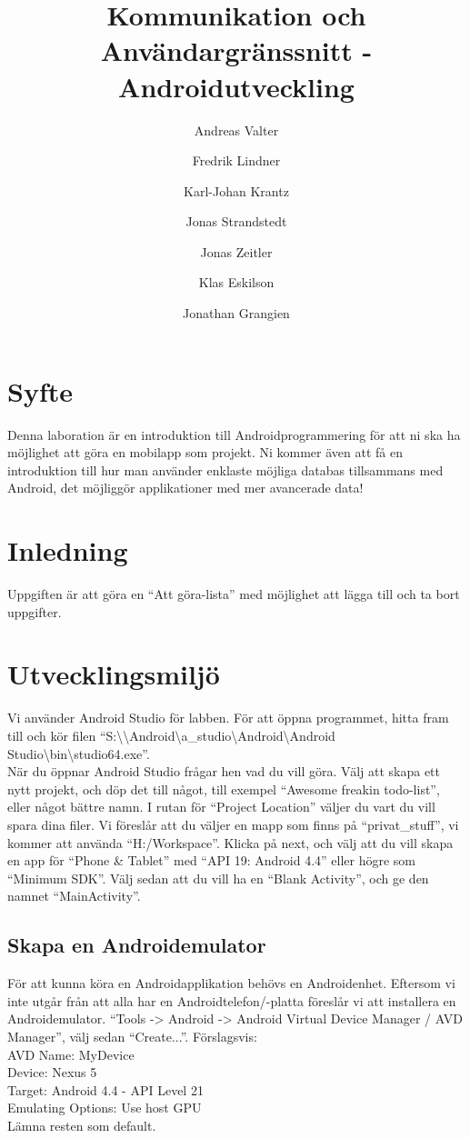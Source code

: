 \documentclass[11 pt, titlepage]{article} %
\begin{document}
\title{Kommunikation och Användargränssnitt - Androidutveckling}
\author{Andreas Valter \and Fredrik Lindner \and Karl-Johan Krantz \and Jonas Strandstedt \and Jonas Zeitler \and Klas Eskilson \and Jonathan Grangien}
\maketitle

\section{Syfte}
Denna laboration är en introduktion till Androidprogrammering för att ni ska ha möjlighet att göra en mobilapp som projekt.
Ni kommer även att få en introduktion till hur man använder enklaste möjliga databas tillsammans med Android, det möjliggör applikationer med mer avancerade data!
\section{Inledning}
Uppgiften är att göra en “Att göra-lista” med möjlighet att lägga till och ta bort uppgifter.
\section{Utvecklingsmiljö}
Vi använder Android Studio för labben. För att öppna programmet, hitta fram till och kör filen ``S:\textbackslash \textbackslash Android\textbackslash a\_studio\textbackslash Android\textbackslash Android Studio\textbackslash bin\textbackslash studio64.exe''.\\

När du öppnar Android Studio frågar hen vad du vill göra.
Välj att skapa ett nytt projekt, och döp det till något, till exempel ``Awesome freakin todo-list'', eller något bättre namn.
I rutan för ``Project Location'' väljer du vart du vill spara dina filer.
Vi föreslår att du väljer en mapp som finns på “privat\_stuff”, vi kommer att använda “H:/Workspace”.
Klicka på next, och välj att du vill skapa en app för ``Phone \& Tablet'' med ``API 19: Android 4.4'' eller högre som ``Minimum SDK''.
Välj sedan att du vill ha en ``Blank Activity'', och ge den namnet ``MainActivity''.\\

\subsection{Skapa en Androidemulator}
För att kunna köra en Androidapplikation behövs en Androidenhet.
Eftersom vi inte utgår från att alla har en Androidtelefon/-platta föreslår vi att installera en Androidemulator.
“Tools -> Android -> Android Virtual Device Manager / AVD Manager”, välj sedan “Create...”. Förslagsvis:
\\
AVD Name: MyDevice\\
Device:  Nexus 5\\
Target:  Android 4.4 - API Level 21\\
Emulating Options:  Use host GPU\\
Lämna resten som default.\\
\end{document}

